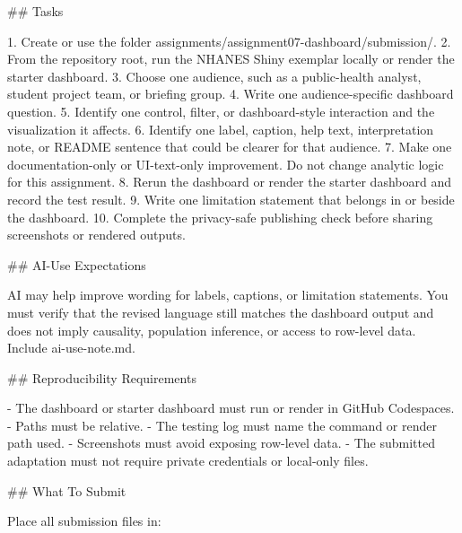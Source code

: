 \documentclass[
  letterpaper,
  DIV=11,
  numbers=noendperiod,
  oneside]{scrreprt}
\newenvironment{Shaded}{\begin{snugshade}}{\end{snugshade}}
\newcommand{\FunctionTok}[1]{\textcolor[rgb]{0.28,0.35,0.67}{#1}}
\newcommand{\InformationTok}[1]{\textcolor[rgb]{0.37,0.37,0.37}{#1}}
\newcommand{\NormalTok}[1]{\textcolor[rgb]{0.00,0.23,0.31}{#1}}
\newcommand{\SpecialStringTok}[1]{\textcolor[rgb]{0.13,0.47,0.30}{#1}}
\begin{document}
\begin{Shaded}
\begin{Highlighting}[numbers=left,,]
\FunctionTok{\#\# Tasks}

\SpecialStringTok{1. }\NormalTok{Create or use the folder }\InformationTok{\textasciigrave{}assignments/assignment07{-}dashboard/submission/\textasciigrave{}}\NormalTok{.}
\SpecialStringTok{2. }\NormalTok{From the repository root, run the NHANES Shiny exemplar locally or render the starter dashboard.}
\SpecialStringTok{3. }\NormalTok{Choose one audience, such as a public{-}health analyst, student project team, or briefing group.}
\SpecialStringTok{4. }\NormalTok{Write one audience{-}specific dashboard question.}
\SpecialStringTok{5. }\NormalTok{Identify one control, filter, or dashboard{-}style interaction and the visualization it affects.}
\SpecialStringTok{6. }\NormalTok{Identify one label, caption, help text, interpretation note, or README sentence that could be clearer for that audience.}
\SpecialStringTok{7. }\NormalTok{Make one documentation{-}only or UI{-}text{-}only improvement. Do not change analytic logic for this assignment.}
\SpecialStringTok{8. }\NormalTok{Rerun the dashboard or render the starter dashboard and record the test result.}
\SpecialStringTok{9. }\NormalTok{Write one limitation statement that belongs in or beside the dashboard.}
\SpecialStringTok{10. }\NormalTok{Complete the privacy{-}safe publishing check before sharing screenshots or rendered outputs.}

\FunctionTok{\#\# AI{-}Use Expectations}

\NormalTok{AI may help improve wording for labels, captions, or limitation statements. You must verify that the revised language still matches the dashboard output and does not imply causality, population inference, or access to row{-}level data. Include }\InformationTok{\textasciigrave{}ai{-}use{-}note.md\textasciigrave{}}\NormalTok{.}

\FunctionTok{\#\# Reproducibility Requirements}

\SpecialStringTok{{-} }\NormalTok{The dashboard or starter dashboard must run or render in GitHub Codespaces.}
\SpecialStringTok{{-} }\NormalTok{Paths must be relative.}
\SpecialStringTok{{-} }\NormalTok{The testing log must name the command or render path used.}
\SpecialStringTok{{-} }\NormalTok{Screenshots must avoid exposing row{-}level data.}
\SpecialStringTok{{-} }\NormalTok{The submitted adaptation must not require private credentials or local{-}only files.}

\FunctionTok{\#\# What To Submit}

\NormalTok{Place all submission files in:}


\end{Highlighting}
\end{Shaded}
\end{document}
